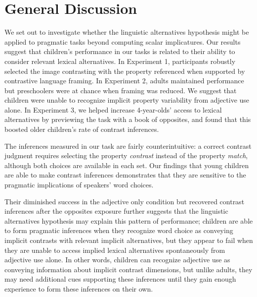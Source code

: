 \documentclass[10pt,letterpaper]{article}
\begin{document}

 \section{General Discussion} 

We set out to investigate whether the linguistic alternatives hypothesis might be applied to pragmatic tasks beyond computing scalar implicatures.  Our results suggest that children's performance in our tasks is related to their ability to consider relevant lexical alternatives.  In Experiment 1, participants robustly selected the image contrasting with the property referenced when supported by contrastive language framing.  In Experiment 2, adults maintained performance but preschoolers were at chance when framing was reduced.  We suggest that children were unable to recognize implicit property variability from adjective use alone.  In Experiment 3, we helped increase 4-year-olds' access to lexical alternatives by previewing the task with a book of opposites, and found that this boosted older children's rate of contrast inferences.  

The inferences measured in our task are fairly counterintuitive: a correct contrast judgment requires selecting the property \emph{contrast} instead of the property \emph{match}, although both choices are available in each set.  Our findings that young children are able to make contrast inferences demonstrates that they are sensitive to the pragmatic implications of speakers' word choices.  

Their diminished success in the adjective only condition but recovered contrast inferences after the opposites exposure further suggests that the linguistic alternatives hypothesis may explain this pattern of performance; children are able to form pragmatic inferences when they recognize word choice as conveying implicit contrasts with relevant implicit alternatives, but they appear to fail when they are unable to access implied lexical alternatives spontaneously from adjective use alone.   In other words, children can recognize adjective use as conveying information about implicit contrast dimensions, but unlike adults, they may need additional cues supporting these inferences until they gain enough experience to form these inferences on their own. 
\end{document}
